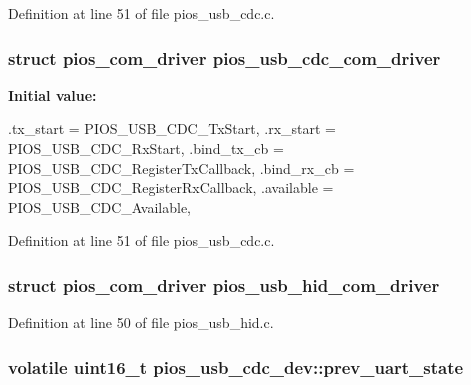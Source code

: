\-Definition at line 51 of file pios\-\_\-usb\-\_\-cdc.\-c.

\hypertarget{group___p_i_o_s___u_s_b___c_o_m_gad661bf144c28ea36f290b0092e6957e2}{
\subsubsection[{pios\-\_\-usb\-\_\-cdc\-\_\-com\-\_\-driver}]{\setlength{\rightskip}{0pt plus 5cm}struct {\bf pios\-\_\-com\-\_\-driver} {\bf pios\-\_\-usb\-\_\-cdc\-\_\-com\-\_\-driver}}}\label{group___p_i_o_s___u_s_b___c_o_m_gad661bf144c28ea36f290b0092e6957e2}
{\bfseries \-Initial value\-:}
\begin{DoxyCode}
 {
        .tx_start    = PIOS_USB_CDC_TxStart,
        .rx_start    = PIOS_USB_CDC_RxStart,
        .bind_tx_cb  = PIOS_USB_CDC_RegisterTxCallback,
        .bind_rx_cb  = PIOS_USB_CDC_RegisterRxCallback,
        .available   = PIOS_USB_CDC_Available,
}
\end{DoxyCode}


\-Definition at line 51 of file pios\-\_\-usb\-\_\-cdc.\-c.

\hypertarget{group___p_i_o_s___u_s_b___c_o_m_ga7bc5f832e095cad60f463436e377bb5d}{
\subsubsection[{pios\-\_\-usb\-\_\-hid\-\_\-com\-\_\-driver}]{\setlength{\rightskip}{0pt plus 5cm}struct {\bf pios\-\_\-com\-\_\-driver} {\bf pios\-\_\-usb\-\_\-hid\-\_\-com\-\_\-driver}}}\label{group___p_i_o_s___u_s_b___c_o_m_ga7bc5f832e095cad60f463436e377bb5d}


\-Definition at line 50 of file pios\-\_\-usb\-\_\-hid.\-c.

\hypertarget{group___p_i_o_s___u_s_b___c_o_m_ga945dfed2223e17061cb6e4257c2b2624}{
\subsubsection[{prev\-\_\-uart\-\_\-state}]{\setlength{\rightskip}{0pt plus 5cm}volatile uint16\-\_\-t {\bf pios\-\_\-usb\-\_\-cdc\-\_\-dev\-::prev\-\_\-uart\-\_\-state}}}\label{group___p_i_o_s___u_s_b___c_o_m_ga945dfed2223e17061cb6e4257c2b2624}


